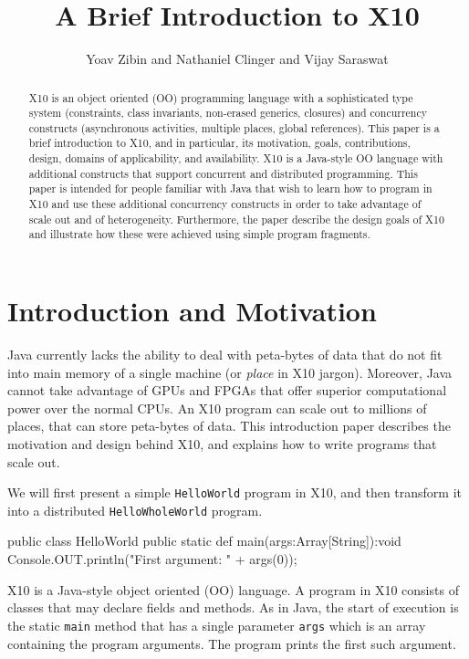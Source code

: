 \documentclass[a4paper]{article}
\title{A Brief Introduction to X10}
\author{Yoav Zibin and Nathaniel Clinger and Vijay Saraswat}
\date{}
\def\codesmaller{\small}
\newcommand{\code}[1]{\texttt{\textup{\codesmaller #1}}}
\begin{document}
\maketitle


\begin{abstract}
X10 is an object oriented (OO) programming language with a sophisticated
    type system (constraints, class invariants, non-erased generics, closures)
    and concurrency constructs (asynchronous activities, multiple places, global references).
This paper is a brief introduction to X10, and in particular,
    its motivation, goals,
    contributions, design, domains of applicability, and availability.
X10 is a Java-style OO language with additional constructs that support concurrent and distributed programming.
This paper is intended for people familiar with Java that wish to learn how to program in X10
    and use these additional concurrency constructs in order to take advantage of scale out and of heterogeneity.
Furthermore, the paper describe the design goals of X10 and illustrate how these were achieved
    using simple program fragments.
\end{abstract}

\section{Introduction and Motivation}
Java currently lacks the ability to deal with peta-bytes of data
    that do not fit into main memory of a single machine (or \emph{place} in X10 jargon).
Moreover, Java cannot take advantage of GPUs and FPGAs that offer superior
    computational power over the normal CPUs.
An X10 program can scale out to millions of places, that can store peta-bytes of data.
This introduction paper describes the motivation and design behind X10,
    and explains how to write programs that scale out.

We will first present a simple \code{HelloWorld} program in X10,
    and then transform it into a distributed \code{HelloWholeWorld} program.

\begin{xten}
public class HelloWorld {
  public static def main(args:Array[String]):void {
     Console.OUT.println("First argument: " + args(0));
  }
}
\end{xten}
X10 is a Java-style object oriented (OO) language.
A program in X10 consists of classes that may
    declare fields and methods.
As in Java, the start of execution is the static \code{main} method
    that has a single parameter \code{args} which is an array containing the program arguments.
The program prints the first such argument.
\end{document}
